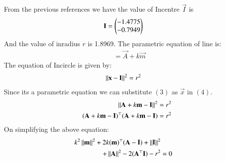 \documentclass[journal,12pt,twocolumn]{IEEEtran}
\theoremstyle{remark}
\begin{document}
\solution
From the previous references we have the value of Incentre $\vec{I}$ is
\begin{align}
\mathbf{I} &=\begin{pmatrix}-1.4775\\-0.7949\end{pmatrix}
\end{align}
And the value of inradius $r$ is 1.8969. The parametric equation of line is:
\begin{align}
&= \vec{A}+k\vec{m}
\end{align}
The equation of Incircle is given by:
\begin{align}
\left\lVert\mathbf{x}-\mathbf{I}\right\rVert^2 &= r^2
\end{align}
Since its a parametric equation we can substitute $(3)$ as $\vec{x}$ in $(4)$.
\begin{align}
\left\lVert\mathbf{A}+k\mathbf{m}-\mathbf{I}\right\rVert^2 &= r^2 \\
(\mathbf{A}+k\mathbf{m}-\mathbf{I})^\top(\mathbf{A}+k\mathbf{m}-\mathbf{I}) &= r^2
\end{align}
On simplifying the above equation:
\begin{align}
k^2\norm{\vec{m}}^2+2k(\vec{m})^\top(\vec{A-I})+\norm{\vec{I}}^2 \nonumber \\
+\norm{\vec{A}}^2-2(\vec{A}^\top\vec{I})-r^2 &= 0
\label{eq:equation}
\end{align}
\end{document}
